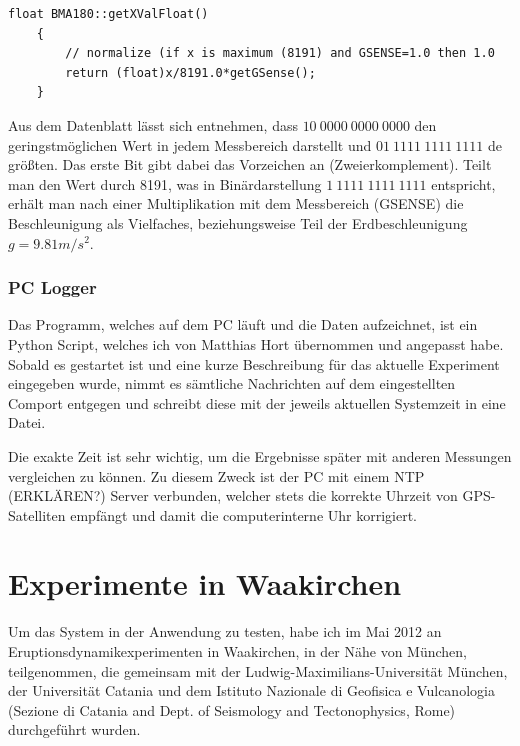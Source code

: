 \documentclass[12pt,a4paper]{scrartcl}
\begin{document}
\begin{lstlisting}[frame=trBL]
	float BMA180::getXValFloat()
	{
	    // normalize (if x is maximum (8191) and GSENSE=1.0 then 1.0
	    return (float)x/8191.0*getGSense();
	}
\end{lstlisting}

Aus dem Datenblatt \citep{Sensortec:2009rt} lässt sich entnehmen, dass $10~0000~0000~0000$ den geringstmöglichen Wert in jedem Messbereich darstellt und $01~1111~1111~1111$ de größten. Das erste Bit gibt dabei das Vorzeichen an (Zweierkomplement). Teilt man den Wert durch 8191, was in Binärdarstellung $1~1111~1111~1111$ entspricht, erhält man nach einer Multiplikation mit dem Messbereich (GSENSE) die Beschleunigung als Vielfaches, beziehungsweise Teil der Erdbeschleunigung $g = 9.81 m/s^2$.


\subsubsection{PC Logger}

Das Programm, welches auf dem PC läuft und die Daten aufzeichnet, ist ein Python Script, welches ich von Matthias Hort übernommen und angepasst habe. Sobald es gestartet ist und eine kurze Beschreibung für das aktuelle Experiment eingegeben wurde, nimmt es sämtliche Nachrichten auf dem eingestellten Comport entgegen und schreibt diese mit der jeweils aktuellen Systemzeit in eine Datei.

Die exakte Zeit ist sehr wichtig, um die Ergebnisse später mit anderen Messungen vergleichen zu können. Zu diesem Zweck ist der PC mit einem NTP (ERKLÄREN?) Server verbunden, welcher stets die korrekte Uhrzeit von GPS-Satelliten empfängt und damit die computerinterne Uhr korrigiert.



\section{Experimente in Waakirchen}

Um das System in der Anwendung zu testen, habe ich im Mai 2012 an Eruptionsdynamikexperimenten in Waakirchen, in der Nähe von München, teilgenommen, die gemeinsam mit der Ludwig-Maximilians-Universität München, der Universität Catania und dem Istituto Nazionale di Geofisica e Vulcanologia (Sezione di Catania and Dept. of Seismology and Tectonophysics, Rome) durchgeführt wurden. 
\end{document}
